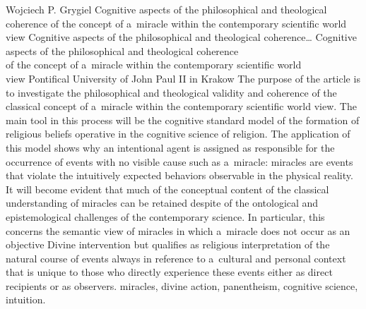 \begin{artengenv}{Wojciech P. Grygiel}
	{Cognitive aspects of the philosophical and theological coherence of the concept of a~miracle within the contemporary scientific world view}
	{Cognitive aspects of the philosophical and theological coherence\ldots}
	{Cognitive aspects of the philosophical and theological coherence\\of the concept of a~miracle within the contemporary scientific world\\
	view}
	{Pontifical University of John Paul II in Krakow\enlargethispage{2\baselineskip}}
	{The purpose of the article is to investigate the philosophical and theological validity and coherence of the classical concept of a~miracle within the contemporary scientific world view. The main tool in this process will be the cognitive standard model of the formation of religious beliefs operative in the cognitive science of religion. The application of %
	this model shows why an intentional agent is assigned as responsible for the occurrence of events with no visible cause such as a~miracle: miracles are events that violate the intuitively expected behaviors observable in the physical reality. It will become evident that much of the conceptual content of the classical understanding of miracles can be retained despite of the ontological and epistemological challenges of the contemporary science. In particular, this concerns the semantic view of miracles in which a~miracle does not occur as an objective Divine intervention but qualifies as religious interpretation of the natural course of events always in reference to a~cultural and personal context that is unique to those who directly experience these events either as direct recipients or as observers.}
	{miracles, divine action, panentheism, cognitive science, intuition.}
	





\end{artengenv}
